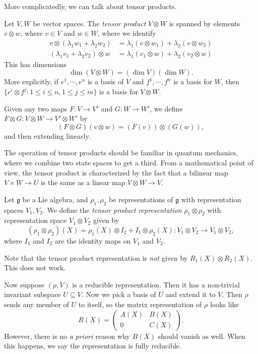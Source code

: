\documentclass[a4paper]{article}
\begin{document}
More complicatedly, we can talk about tensor products.
\begin{defi}
  Let $V, W$ be vector spaces. The \emph{tensor product} $V \otimes W$ is spanned by elements $v \otimes w$, where $v \in V$ and $w \in W$, where we identify
  \begin{align*}
    v \otimes (\lambda_1 w_1 + \lambda_2 w_2) &= \lambda_1 (v \otimes w_1) + \lambda_2 (v \otimes w_2)\\
    (\lambda_1 v_1 + \lambda_2 v_2) \otimes w &= \lambda_1 (v_1 \otimes w) + \lambda_2 (v_2 \otimes w)
  \end{align*}
  This has dimensions
  \[
    \dim (V \otimes W) = (\dim V)(\dim W).
  \]
  More explicitly, if $e^1, \cdots, e^n$ is a basis of $V$ and $f^1 ,\cdots, f^n$ is a basis for $W$, then $\{e^i \otimes f^j: 1 \leq i \leq n, 1 \leq j \leq m\}$ is a basis for $V \otimes W$.

  Given any two maps $F: V \to V'$ and $G: W \to W'$, we define $F \otimes G: V \otimes W \to V' \otimes W'$ by
  \[
    (F \otimes G) (v \otimes w) = (F(v)) \otimes (G(w)),
  \]
  and then extending linearly.
\end{defi}
The operation of tensor products should be familiar in quantum mechanics, where we combine two state spaces to get a third. From a mathematical point of view, the tensor product is characterized by the fact that a bilinear map $V \times W \to U$ is the same as a linear map $V \otimes W \to V$.

\begin{defi}
  Let $\mathfrak{g}$ be a Lie algebra, and $\rho_1, \rho_2$ be representations of $\mathfrak{g}$ with representation spaces $V_1, V_2$. We define the \emph{tensor product representation} $\rho_1 \otimes \rho_2$ with representation space $V_1 \otimes V_2$ given by
  \[
    (\rho_1 \otimes \rho_2)(X) = \rho_1(X) \otimes I_2 + I_1 \otimes \rho_2(X): V_1 \otimes V_2 \to V_1 \otimes V_2,
  \]
  where $I_1$ and $I_2$ are the identity maps on $V_1$ and $V_2$.
\end{defi}

Note that the tensor product representation is \emph{not} given by $R_1(X) \otimes R_2(X)$. This does not work.

Now suppose $(\rho, V)$ is a reducible representation. Then it has a non-trivial invariant subspace $U \subseteq V$. Now we pick a basis of $U$ and extend it to $V$. Then $\rho$ sends any member of $U$ to itself, so the matrix representation of $\rho$ looks like
\[
  R(X) =
  \begin{pmatrix}
    A(X) & B(X)\\
    0 & C(X)
  \end{pmatrix}.
\]
However, there is no \emph{a priori} reason why $B(X)$ should vanish as well. When this happens, we say the representation is fully reducible.
\end{document}
